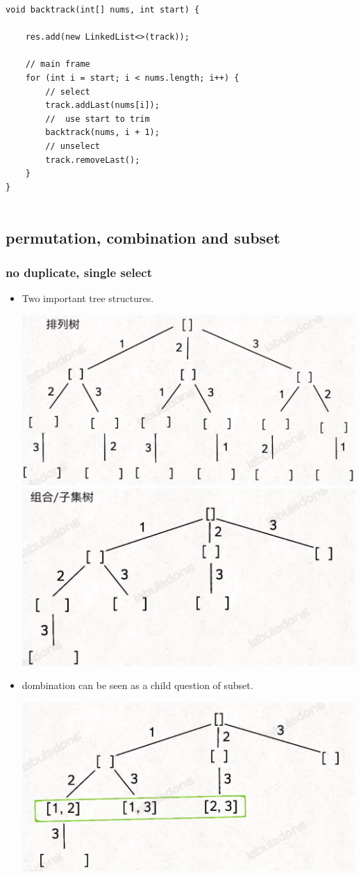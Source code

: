 \documentclass[a4paper,11pt,twoside]{book}
\begin{document}
\begin{itemize}
\begin{lstlisting}
void backtrack(int[] nums, int start) {
	
	res.add(new LinkedList<>(track));
	
	// main frame
	for (int i = start; i < nums.length; i++) {
		// select
		track.addLast(nums[i]);
		//  use start to trim
		backtrack(nums, i + 1);
		// unselect
		track.removeLast();
	}
}


\end{lstlisting}


\subsection{permutation, combination and subset}
\subsubsection{no duplicate, single select}
\begin{itemize}
	\item Two important tree structures.
\begin{center}
	\includegraphics[width=0.7\linewidth]{pics/per}
	\includegraphics[width=0.7\linewidth]{pics/com}
\end{center}
		
	\item dombination can be seen as a child question of subset. 
	\begin{center}
		\includegraphics[width=0.7\linewidth]{pics/subset}
	\end{center}
	

\end{itemize}
\end{itemize}
\end{document}
